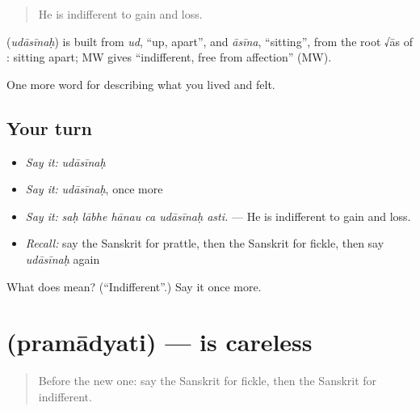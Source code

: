 \begin{quote}
He is indifferent to gain and loss.
\end{quote}

\begin{cousinweb}
\textbf{} (\emph{udāsīnaḥ}) is built from \emph{ud}, \textquotedblleft{}up, apart\textquotedblright{}, and \emph{āsīna}, \textquotedblleft{}sitting\textquotedblright{}, from the root √ās of \textbf{}: sitting apart; MW gives \textquotedblleft{}indifferent, free from affection\textquotedblright{} (MW).
\end{cousinweb}

\begin{grammarlens}[title={What you've built}]
One more word for describing what you lived and felt.
\end{grammarlens}

\subsection*{Your turn}
\begin{itemize}
\raggedright
  \item \emph{Say it:} \emph{udāsīnaḥ}
  \item \emph{Say it:} \emph{udāsīnaḥ}, once more
  \item \emph{Say it:} \emph{saḥ lābhe hānau ca udāsīnaḥ asti.} — He is indifferent to gain and loss.
  \item \emph{Recall:} say the Sanskrit for prattle, then the Sanskrit for fickle, then say \emph{udāsīnaḥ} again
\end{itemize}

\begin{tcolorbox}[breakable,colback=teal!4,colframe=teal!35!black,title={Before you move on}]
What does  mean? (\textquotedblleft{}Indifferent\textquotedblright{}.) Say it once more.
\end{tcolorbox}
\section[\texorpdfstring{\sk{प्रमाद्यति} (pramādyati)}{प्रमाद्यति (pramādyati)}]{ (pramādyati) — is careless}

\label{lesson:SA-C465-pramadyati}



\begin{quote}
Before the new one: say the Sanskrit for fickle, then the Sanskrit for indifferent.
\end{quote}

